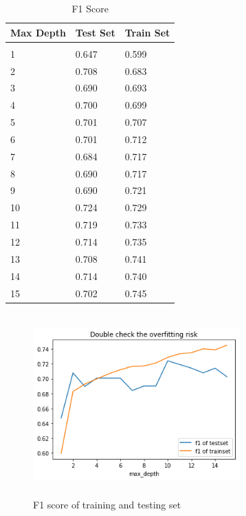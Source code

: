 \documentclass{article} %
\begin{document}
\begin{table}[H]
	\caption{F1 Score}
	\label{sample-table}
	\begin{center}
		\begin{tabular}{|l|l|l|}
			\multicolumn{1}{c}{\bf Max Depth}  
			&\multicolumn{1}{c}{\bf Test Set}
			&\multicolumn{1}{c}{\bf Train Set}
			\\ \hline & &  \\
			1        &0.647 &0.599	 \\
			2        &0.708	&0.683	  \\
			3        &0.690	&0.693	 \\
			4        &0.700	&0.699	 \\
			5        &0.701	&0.707 \\
			6        &0.701 &0.712   \\
			7        &0.684 &0.717   \\
			8        &0.690 &0.717   \\
			9        &0.690 &0.721    \\
			10       &0.724  &0.729    \\
			11       &0.719  &0.733   \\
			12       &0.714 &0.735  \\
			13       &0.708 &0.741  \\
			14       &0.714 &0.740  \\
			15       &0.702 &0.745  \\
			\hline
		\end{tabular}
	\end{center}
\end{table}



\begin{figure}[H]
	\centering
	\includegraphics[height=7cm, width=8cm]{4.png}
	\caption{F1 score of training and testing set}
\end{figure}
\end{document}
